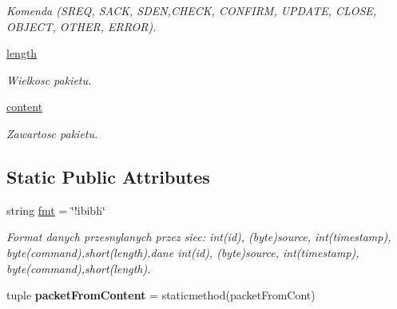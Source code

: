 \begin{CompactItemize}
\begin{CompactList}\small\item\em Komenda (SREQ, SACK, SDEN,CHECK, CONFIRM, UPDATE, CLOSE, OBJECT, OTHER, ERROR). \item\end{CompactList}\item 
\hypertarget{class_serv_1_1_packet_1_1_packet_1_1_communicates_de69559f430591a603b3acf91e6c6dfe}{
\hyperlink{class_serv_1_1_packet_1_1_packet_1_1_communicates_de69559f430591a603b3acf91e6c6dfe}{length}}
\label{class_serv_1_1_packet_1_1_packet_1_1_communicates_de69559f430591a603b3acf91e6c6dfe}

\begin{CompactList}\small\item\em Wielkosc pakietu. \item\end{CompactList}\item 
\hypertarget{class_serv_1_1_packet_1_1_packet_1_1_communicates_3532960efe7c0aaa93d69fe80ebfc65d}{
\hyperlink{class_serv_1_1_packet_1_1_packet_1_1_communicates_3532960efe7c0aaa93d69fe80ebfc65d}{content}}
\label{class_serv_1_1_packet_1_1_packet_1_1_communicates_3532960efe7c0aaa93d69fe80ebfc65d}

\begin{CompactList}\small\item\em Zawartosc pakietu. \item\end{CompactList}\end{CompactItemize}
\subsection*{Static Public Attributes}
\begin{CompactItemize}
\item 
\hypertarget{class_serv_1_1_packet_1_1_packet_1_1_communicates_a6c72d5100aa9f954def5f03d4fb7652}{
string \hyperlink{class_serv_1_1_packet_1_1_packet_1_1_communicates_a6c72d5100aa9f954def5f03d4fb7652}{fmt} = \char`\"{}!ibibh\char`\"{}}
\label{class_serv_1_1_packet_1_1_packet_1_1_communicates_a6c72d5100aa9f954def5f03d4fb7652}

\begin{CompactList}\small\item\em Format danych przesnylanych przez siec: int(id), (byte)source, int(timestamp), byte(command),short(length),dane int(id), (byte)source, int(timestamp), byte(command),short(length). \item\end{CompactList}\item 
\hypertarget{class_serv_1_1_packet_1_1_packet_1_1_communicates_66f41044c1723c98c98da5c65bb9dd85}{
tuple \textbf{packetFromContent} = staticmethod(packetFromCont)}
\label{class_serv_1_1_packet_1_1_packet_1_1_communicates_66f41044c1723c98c98da5c65bb9dd85}

\end{CompactItemize}


